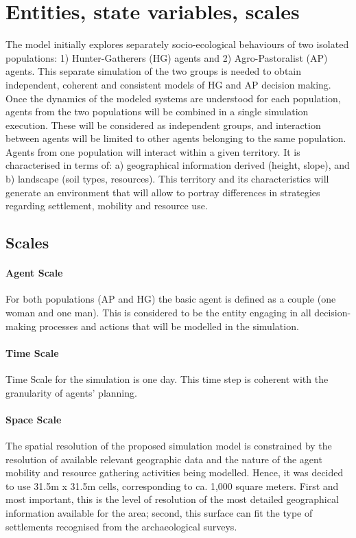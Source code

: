 \section{Entities, state variables, scales}
The model initially explores separately socio-ecological behaviours of two isolated populations: 1)
Hunter-Gatherers (HG) agents and 2) Agro-Pastoralist (AP) agents. This separate simulation of the
two groups is needed to obtain independent, coherent and consistent models of HG and AP decision
making. Once the dynamics of the modeled systems are understood for each population, agents from
the two populations will be combined in a single simulation execution. These will be considered as
independent groups, and interaction between agents will be limited to other agents belonging to the
same population.
Agents from one population will interact within a given territory. It is characterised in terms of: a)
geographical information derived (height, slope), and b) landscape (soil types, resources). This
territory and its characteristics will generate an environment that will allow to portray differences in
strategies regarding settlement, mobility and resource use.

\subsection{Scales}
\paragraph{Agent Scale}

For both populations (AP and HG) the basic agent is defined as a couple (one woman and one man).
This is considered to be the entity engaging in all decision-making processes and actions that will be
modelled in the simulation.

\paragraph{Time Scale}
Time Scale for the simulation is one day. This time step is coherent with the granularity of agents’
planning.
\paragraph{Space Scale}
The spatial resolution of the proposed simulation model is constrained by the resolution of available
relevant geographic data and the nature of the agent mobility and resource gathering activities being
modelled.
Hence, it was decided to use 31.5m x 31.5m cells, corresponding to ca. 1,000 square meters. First
and most important, this is the level of resolution of the most detailed geographical information
available for the area; second, this surface can fit the type of settlements recognised from the
archaeological surveys.

